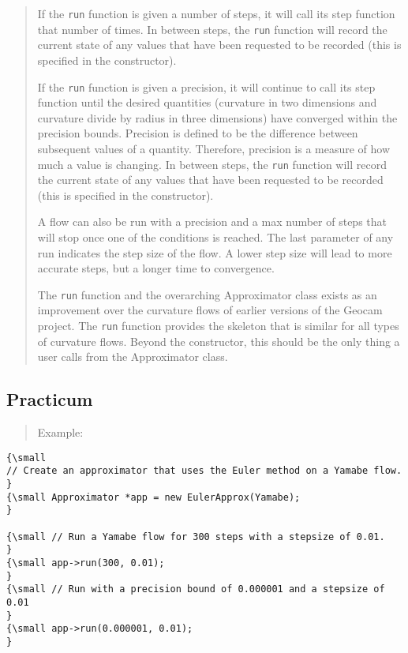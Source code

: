 \begin{quotation}
If the \texttt{run} function is given a number of steps, it will call its
step function that number of times. In between steps, the \texttt{run}
function will record the current state of any values that have been
requested to be recorded (this is specified in the constructor).

If the \texttt{run} function is given a precision, it will continue to call
its step function until the desired quantities (curvature in two dimensions
and curvature divide by radius in three dimensions) have converged within
the precision bounds. Precision is defined to be the difference between
subsequent values of a quantity. Therefore, precision is a measure of how
much a value is changing. In between steps, the \texttt{run} function will
record the current state of any values that have been requested to be
recorded (this is specified in the constructor).

A flow can also be run with a precision and a max number of steps that will
stop once one of the conditions is reached. The last parameter of any run
indicates the step size of the flow. A lower step size will lead to more
accurate steps, but a longer time to convergence.

The \texttt{run} function and the overarching Approximator class exists as
an improvement over the curvature flows of earlier versions of the Geocam
project. The \texttt{run} function provides the skeleton that is similar for
all types of curvature flows. Beyond the constructor, this should be the
only thing a user calls from the Approximator class.
\end{quotation}

\subsection*{Practicum}

\begin{quotation}
Example:
\end{quotation}

{\small }
\begin{verbatim}
{\small 
// Create an approximator that uses the Euler method on a Yamabe flow.
}
{\small Approximator *app = new EulerApprox(Yamabe);
}
 
{\small // Run a Yamabe flow for 300 steps with a stepsize of 0.01.
}
{\small app->run(300, 0.01);
}
{\small // Run with a precision bound of 0.000001 and a stepsize of 0.01
}
{\small app->run(0.000001, 0.01);
}
\end{verbatim}

